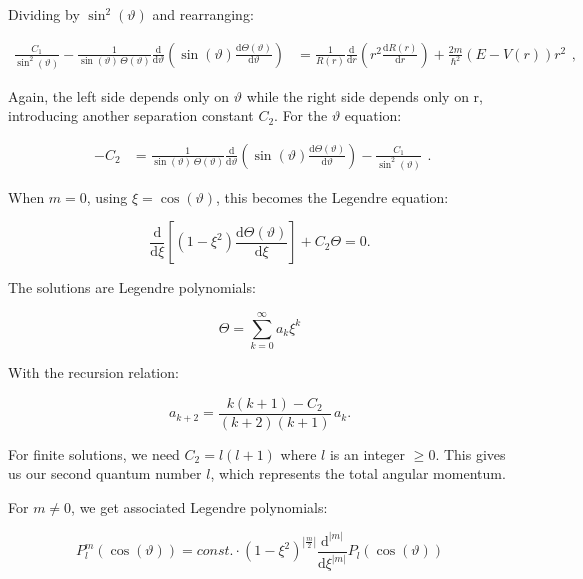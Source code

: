\documentclass[
  a4paper,
]{book}
\begin{document}
Dividing by \(\sin^2 \left( \vartheta \right)\) and rearranging:

\[
\begin{aligned}
\frac{C_1}{\sin^2 \left( \vartheta \right)}
-\frac{1}{\sin \left( \vartheta \right) \, \Theta \left(\vartheta\right) } \frac{\mathrm{d}}{\mathrm{d} \vartheta} \left( \sin \left( \vartheta \right) \frac{\mathrm{d} \Theta \left(\vartheta\right)}{\mathrm{d} \vartheta} \right)
& =
\frac{1}{R \left( r \right)} \frac{\mathrm{d}}{\mathrm{d} r} \left( r^2 \frac{\mathrm{d} R \left( r \right)}{\mathrm{d} r} \right)
+ \frac{2m}{\hbar^2} \left( E - V\left( r \right) \right) r^2
\end{aligned} \mathrm{,}
\]

Again, the left side depends only on \(\vartheta\) while the right side
depends only on r, introducing another separation constant \(C_2\). For
the \(\vartheta\) equation:

\[
\begin{aligned}
- C_2 & =  \frac{1}{\sin \left( \vartheta \right) \, \Theta \left(\vartheta\right) } \frac{\mathrm{d}}{\mathrm{d} \vartheta} \left( \sin \left( \vartheta \right) \frac{\mathrm{d} \Theta \left(\vartheta\right)}{\mathrm{d} \vartheta} \right)
- \frac{C_1}{\sin^2 \left( \vartheta \right)}
\end{aligned} \mathrm{.}
\]

When \(m = 0\), using \(\xi = \cos(\vartheta)\), this becomes the
Legendre equation:

\[
\frac{\mathrm{d}}{\mathrm{d} \xi} \left[ \left(1-\xi^2 \right) \frac{\mathrm{d} \Theta \left(\vartheta \right)}{\mathrm{d} \xi} \right] + C_2 \Theta = 0 \mathrm{.}
\]

The solutions are Legendre polynomials:

\[
\Theta = \sum_{k=0}^{\infty} a_k \xi^k
\]

With the recursion relation:

\[
a_{k+2} = \frac{k \left( k+1 \right) - C_2}{\left(k+2\right) \left(k+1\right)} \, a_k \mathrm{.}
\]

For finite solutions, we need \(C_2 = l(l+1)\) where \(l\) is an integer
\(\geq 0\). This gives us our second quantum number \(l\), which
represents the total angular momentum.

For \(m \neq 0\), we get associated Legendre polynomials:

\[
P_l^m \left( \cos \left( \vartheta \right) \right)
= const. \cdot \left(1-\xi^2\right)^{\left|\frac{m}{2}\right|}
\frac{\mathrm{d}^{\left|m\right|}}{\mathrm{d} \xi^{\left|m\right|}} P_l \left( \cos \left( \vartheta \right) \right)
\]
\end{document}
